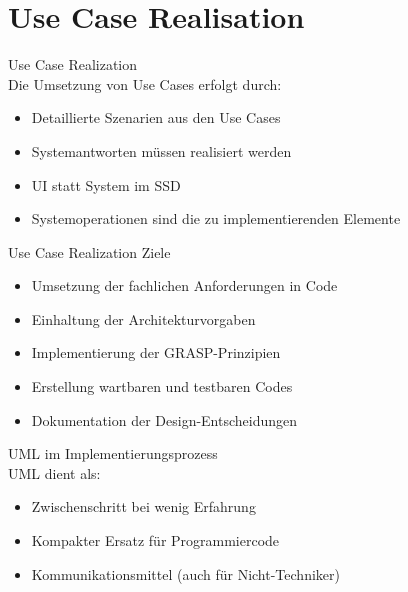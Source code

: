 \section{Use Case Realisation}

\begin{concept}{Use Case Realization}\\
Die Umsetzung von Use Cases erfolgt durch:
\begin{itemize}
    \item Detaillierte Szenarien aus den Use Cases
    \item Systemantworten müssen realisiert werden
    \item UI statt System im SSD
    \item Systemoperationen sind die zu implementierenden Elemente
\end{itemize}
\end{concept}

\begin{theorem}{Use Case Realization Ziele}
\begin{itemize}
    \item Umsetzung der fachlichen Anforderungen in Code
    \item Einhaltung der Architekturvorgaben
    \item Implementierung der GRASP-Prinzipien
    \item Erstellung wartbaren und testbaren Codes
    \item Dokumentation der Design-Entscheidungen
\end{itemize}
\end{theorem}

\begin{definition}{UML im Implementierungsprozess}\\
UML dient als:
\begin{itemize}
    \item Zwischenschritt bei wenig Erfahrung
    \item Kompakter Ersatz für Programmiercode
    \item Kommunikationsmittel (auch für Nicht-Techniker)
\end{itemize}
\end{definition}

